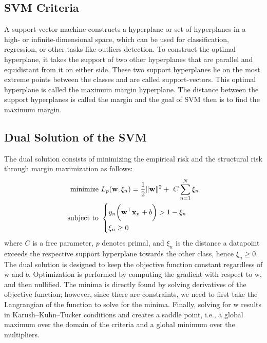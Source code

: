 \documentclass[journal]{IEEEtran}
\begin{document}
\subsection{SVM Criteria}

A support-vector machine constructs a hyperplane or set of hyperplanes in a high- or infinite-dimensional space, which can be used for classification, regression, or other tasks like outliers detection. To construct the optimal hyperplane, it takes the support of two other hyperplanes that are parallel and equidistant from it on either side. These two support hyperplanes lie on the most extreme points between the classes and are called support-vectors. This optimal hyperplane is called the maximum margin hyperplane. The distance between the support hyperplanes is called the margin and the goal of SVM then is to find the maximum margin.

\subsection{Dual Solution of the SVM}

The dual solution consists of minimizing the empirical risk and the structural risk through margin maximization as follows:
\begin{align}
	\text{minimize } &L_p(\bm{\mathrm{w}},\xi_n) = \frac{1}{2} \| \bm{\mathrm{w}} \|^2 +\ C \sum_{n=1}^{N} \xi_n\\
    \notag\text{subject to }&
        \begin{dcases}
            y_n\biggl(\bm{\mathrm{w}}^\top\bm{\mathrm{x}}_n + b\biggr) > 1 - \xi_n\\
            \xi_n \geq 0
        \end{dcases}
\end{align}
where \( C \) is a free parameter, \( p \) denotes primal, and \( \xi_n \) is  the distance a datapoint exceeds the respective support hyperplane towards the other class, hence \( \xi_n \geq 0\). The dual solution is designed to keep the objective function constant regardless of \( \bm{\mathrm{w}} \) and \( b \). Optimization is performed by computing the gradient with respect to \( \bm{\mathrm {w}} \), and then nullified. The minima is directly found by solving derivatives of the objective function; however, since there are constraints, we need to first take the Langrangian of the function to solve for the minima. Finally, solving for \( \bm{\mathrm {w}} \) results in Karush--Kuhn--Tucker conditions and creates a saddle point, i.e., a global maximum over the domain of the criteria and a global minimum over the multipliers.
\end{document}

